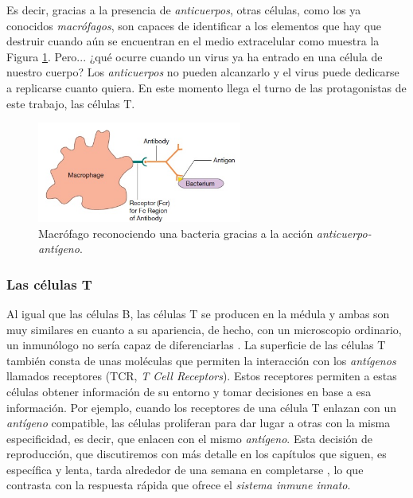Es decir, gracias a la presencia de \textit{anticuerpos}, otras células, como los ya conocidos \textit{macrófagos}, son capaces de identificar a los elementos que hay que destruir cuando aún se encuentran en el medio extracelular como muestra la Figura \ref{fig:macrofago_anticuerpo}. Pero... ¿qué ocurre cuando un virus ya ha entrado en una célula de nuestro cuerpo? Los \textit{anticuerpos} no pueden alcanzarlo y el virus puede dedicarse a replicarse cuanto quiera. En este momento llega el turno de las protagonistas de este trabajo, las células T. 



\begin{figure}[t]
	\centering
	\includegraphics[width=0.6\textwidth]{2_macrofago_anticuerpo}
	\caption{Macrófago reconociendo una bacteria gracias a la acción \textit{anticuerpo-antígeno}.}
	\label{fig:macrofago_anticuerpo}
\end{figure}


\subsubsection{Las células T}
\label{Tcell}

Al igual que las células B, las células T se producen en la médula y ambas son muy similares en cuanto a su apariencia, de hecho, con un microscopio ordinario, un inmunólogo no sería capaz de diferenciarlas \citep{theHowItWorks}. La superficie de las células T también consta de unas moléculas que permiten la interacción con los \textit{antígenos} llamados receptores (TCR, \textit{T Cell Receptors}). Estos receptores permiten a estas células obtener información de su entorno y tomar decisiones en base a esa información. Por ejemplo, cuando los receptores de una célula T enlazan con un \textit{antígeno} compatible, las células proliferan para dar lugar a otras con la misma especificidad, es decir, que enlacen con el mismo \textit{antígeno}. Esta decisión de reproducción, que discutiremos con más detalle en los capítulos que siguen, es específica y lenta, tarda alrededor de una semana en completarse \citep{theHowItWorks}, lo que contrasta con la respuesta rápida que ofrece el \textit{sistema inmune innato}.

